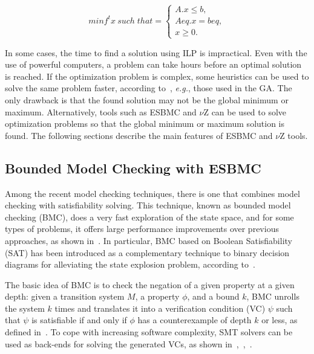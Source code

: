 \documentclass{doublecol-new}
\theoremstyle{TH}{
\newtheorem{lemma}{Lemma}
\newtheorem{theorem}[lemma]{Theorem}
\newtheorem{corrolary}[lemma]{Corrolary}
\newtheorem{conjecture}[lemma]{Conjecture}
\newtheorem{proposition}[lemma]{Proposition}
\newtheorem{claim}[lemma]{Claim}
\newtheorem{stheorem}[lemma]{Wrong Theorem}
\newtheorem{algorithm}{Algorithm}
}
\theoremstyle{THrm}{
\newtheorem{definition}{Definition}[section]
\newtheorem{question}{Question}[section]
\newtheorem{remark}{Remark}
\newtheorem{scheme}{Scheme}
}
\theoremstyle{THhit}{
\newtheorem{case}{Case}[section]
}
\begin{document}
\vspace{2 mm}
\begin{equation}
\label{linear-programming-problem}
  minf^t x \: such \; that  = 
  \begin{cases}
    A.x \leq b, \\ 
    Aeq.x = beq, \\ 
    x \geq 0.
  \end{cases}
\end{equation}

\vspace{2 mm}
In some cases, the time to find a solution using ILP is impractical. Even with the use of powerful computers, a problem can take hours before an optimal solution is reached. If the optimization problem is complex, some heuristics can be used to solve the same problem faster, according to~\cite{Rao2009}, {\it e.g.}, those used in the GA. The only drawback is that the found solution may not be the global minimum or maximum. Alternatively, tools such as ESBMC and $\nu$Z can be used to solve optimization problems so that the global minimum or maximum solution is found. The following sections describe the main features of ESBMC and $\nu$Z tools.

\subsection{Bounded Model Checking with ESBMC}
\label{Bounded-Model-Checking-with-ESBMC}

Among the recent model checking techniques, there is one that combines model checking with satisﬁability solving. This technique, known as bounded model checking (BMC), does a very fast exploration of the state space, and for some types of problems, it offers large performance improvements over previous approaches, as shown in~\cite{Biere2009}. In particular, BMC based on Boolean Satisfiability (SAT) has been introduced as a complementary technique to binary decision diagrams for alleviating the state explosion problem, according to~\cite{Clarke2001}. 

The basic idea of BMC is to check the negation of a given property at a given depth: given a transition system $M$, a property $\phi$, and a bound $k$, BMC unrolls the system $k$ times and translates it into a verification condition (VC) $\psi$  such that $\psi$ is satisfiable if and only if $\phi$ has a counterexample of depth $k$ or less, as defined in~\cite{Biere2009}. To cope with increasing software complexity, SMT solvers can be used as back-ends for solving the generated VCs, as shown in~\cite{Cordeiro2012},~\cite{Armando2009},~\cite{Ganai2006}. 
\end{document}
